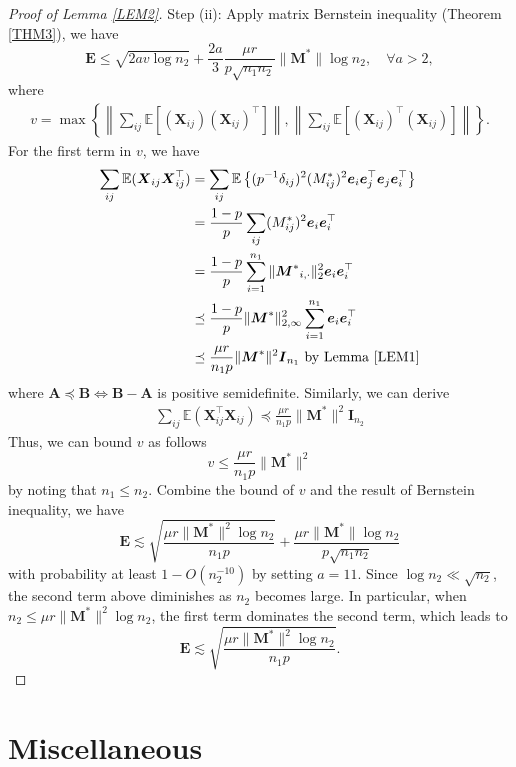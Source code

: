 \documentclass[12pt]{article}
\theoremstyle{remark}
\newcommand{\bs}[1]{{\boldsymbol{#1}^*}}
\newcommand{\bb}[1]{{\boldsymbol {#1}}}
\begin{document}
\begin{proof}[Proof of Lemma \ref{LEM2}]
Step (ii): 
Apply matrix Bernstein inequality (Theorem \ref{THM3}), we have \[
\bb E\leq \sqrt{2av\log n_2} + \frac{2a}{3} \frac{\mu r}{p\sqrt{n_1 n_2}}\|\bs M\| \log n_2, \quad \forall a>2,
\]
where 
\begin{align*}
v = 
\max \left\{ \left\|\sum_{ij} \mathbb{E}\left[\left(\bb X_{ij}\right)\left(\bb X_{ij}\right)^{\top}\right] \right\|,
\left\|\sum_{ij} \mathbb{E}\left[\left(\bb X_{ij}\right)^{\top}\left(\bb X_{ij}\right)\right]\right\|\right\}.
\end{align*}
For the first term in $v$,  we have
\begin{align*}
\sum_{ij}\mathbb E(\bb X_{ij} \bb X_{ij}^\top) 
& = \sum_{ij} \mathbb E \left\{ (p^{-1} \delta_{ij})^2 (M_{ij}^*)^2 \bb e_i \bb e_j ^\top \bb e_j \bb e_i^\top \right\}\\
& = \frac{1-p}{p}\sum_{ij} (M_{ij}^*)^2 \bb e_i \bb e_i^\top\\
& = \frac{1-p}{p}\sum_{i=1}^{n_1} \|\bs M_{i,\cdot}\|_2^2 \bb e_i \bb e_i^\top\\
&\preceq \frac{1-p}{p} \|\bs M\|_{2,\infty}^2 \sum_{i=1}^{n_1}\bb e_i \bb e_i^\top \\
& \preceq \frac{\mu r}{ n_1 p }\|\bs M\|^2 \bb I_{n_1} \text{ by Lemma \ref{LEM1}}
\end{align*}
where $\bb A\preceq\bb B \iff \bb B - \bb A$ is positive semidefinite.  
Similarly, we can derive 
\begin{align*}
\sum_{ij}\mathbb E(\bb X_{ij}^\top \bb X_{ij})  \preceq \frac{\mu r}{ n_1 p }\|\bs M\|^2 \bb I_{n_2}
\end{align*}
Thus, we can bound $v$ as follows
$$
v\leq \frac{\mu r}{n_1 p} \|\bs M\|^2
$$
by noting that $n_1\leq n_2$.
Combine the bound of $v$ and the result of Bernstein inequality, we have 
$$
\bb E\lesssim \sqrt{\frac{\mu r \|\bs M\|^2\log n_2 }{n_1 p}} + \frac{\mu r \|\bs M\| \log n_2}{ p\sqrt{n_1 n_2}}
$$
with probability at least $1-O(n_2^{-10})$ by setting $a = 11$.
Since $\log n_2 \ll \sqrt{n_2}$, the second term above diminishes as $n_2$ becomes large. 
In particular, when $n_2 \leq \mu r \|\bs M\|^2 \log n_2$, the first term dominates the second term, which leads to 
$$
\bb E\lesssim \sqrt{\frac{\mu r \|\bs M\|^2\log n_2}{n_1 p}}.
$$
\end{proof}



\section{Miscellaneous}
\end{document}

